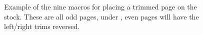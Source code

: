\begin{figure}[htbp]
  \hfill

  \caption{Example of the nine  macros for placing
    a trimmed page on the stock. These are all odd pages, under
    , even pages will have the left/right trims reversed.}
  \label{fig:setpage}
\end{figure}





